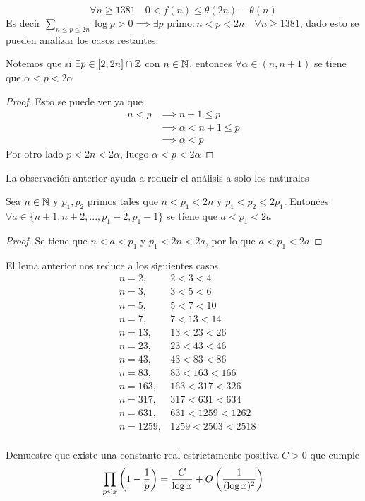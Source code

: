 \begin{sol}
	\[\forall n\geq1381\quad0<f(n)\leq\theta(2n)-\theta(n)\]
	Es decir $\displaystyle\sum_{n\leq p\leq 2n}\log{p}>0\implies\exists p\text{ primo}:n<p<2n\quad\forall n\geq1381$, dado esto se pueden analizar los casos restantes.
	\begin{obs}
		Notemos que si $\exists p\in[2,2n]\cap\mathbb{Z}$ con $n\in\mathbb{N}$, entonces $\forall\alpha\in(n,n+1)$ se tiene que $\alpha<p<2\alpha$
		\begin{proof}
			Esto se puede ver ya que
			\begin{align*}
				n<p & \implies n+1\leq p       \\
				    & \implies\alpha<n+1\leq p \\
				    & \implies\alpha<p
			\end{align*}
			Por otro lado $p<2n<2\alpha$, luego $\alpha<p<2\alpha$
		\end{proof}
	\end{obs}
	{\flushleft La observación anterior ayuda a reducir el análisis a solo los naturales}
	\begin{lem}
		Sea $n\in\mathbb{N}$ y $p_1,p_2$ primos tales que $n<p_1<2n$ y $p_1<p_2<2p_1$. Entonces $\forall a\in\{n+1,n+2,...,p_1-2,p_1-1\}$ se tiene que $a<p_1<2a$
		\begin{proof}
			Se tiene que $n<a<p_1$ y $p_1<2n<2a$, por lo que $a<p_1<2a$
		\end{proof}
	\end{lem}
	{\flushleft El lema anterior nos reduce a los siguientes casos}
	\begin{align*}
		 & n=2,    & 2<3<4          \\
		 & n=3,    & 3<5<6          \\
		 & n=5,    & 5<7<10         \\
		 & n=7,    & 7<13<14        \\
		 & n=13,   & 13<23<26       \\
		 & n=23,   & 23<43<46       \\
		 & n=43,   & 43<83<86       \\
		 & n=83,   & 83<163<166     \\
		 & n=163,  & 163<317<326    \\
		 & n=317,  & 317<631<634    \\
		 & n=631,  & 631<1259<1262  \\
		 & n=1259, & 1259<2503<2518 \\
	\end{align*}

\end{sol}

\begin{prob}[4 pts.]
	Demuestre que existe una constante real estrictamente positiva $C>0$ que cumple
	\[\prod_{p\leq x}\left(1-\frac{1}{p}\right)=\frac{C}{\log x}+O\left(\frac{1}{(\log x)^2}\right)\]
\end{prob}

\begin{sol}

\end{sol}

